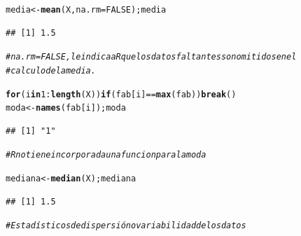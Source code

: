 \documentclass[12pt,letterpaper]{article}\usepackage[]{graphicx}\usepackage[]{color}
\makeatletter
\newcommand{\hlnum}[1]{\textcolor[rgb]{0.686,0.059,0.569}{#1}}%
\newcommand{\hlcom}[1]{\textcolor[rgb]{0.678,0.584,0.686}{\textit{#1}}}%
\newcommand{\hlopt}[1]{\textcolor[rgb]{0,0,0}{#1}}%
\newcommand{\hlstd}[1]{\textcolor[rgb]{0.345,0.345,0.345}{#1}}%
\newcommand{\hlkwa}[1]{\textcolor[rgb]{0.161,0.373,0.58}{\textbf{#1}}}%
\newcommand{\hlkwb}[1]{\textcolor[rgb]{0.69,0.353,0.396}{#1}}%
\newcommand{\hlkwc}[1]{\textcolor[rgb]{0.333,0.667,0.333}{#1}}%
\newcommand{\hlkwd}[1]{\textcolor[rgb]{0.737,0.353,0.396}{\textbf{#1}}}%
\newenvironment{kframe}{%
 \def\at@end@of@kframe{}%
 \ifinner\ifhmode%
  \def\at@end@of@kframe{\end{minipage}}%
  \begin{minipage}{\columnwidth}%
 \fi\fi%
 \def\FrameCommand##1{\hskip\@totalleftmargin \hskip-\fboxsep
 \colorbox{shadecolor}{##1}\hskip-\fboxsep
     \hskip-\linewidth \hskip-\@totalleftmargin \hskip\columnwidth}%
 \MakeFramed {\advance\hsize-\width
   \@totalleftmargin\z@ \linewidth\hsize
   \@setminipage}}%
 {\par\unskip\endMakeFramed%
 \at@end@of@kframe}
\newenvironment{knitrout}{}{} %
\makeatother
\begin{document}
\begin{enumerate}
\begin{knitrout}
\begin{kframe}
\begin{alltt}
\hlstd{media} \hlkwb{<-} \hlkwd{mean}\hlstd{(X,} \hlkwc{na.rm} \hlstd{=} \hlnum{FALSE}\hlstd{); media}
\end{alltt}
\begin{verbatim}
## [1] 1.5
\end{verbatim}
\begin{alltt}
\hlcom{# na.rm = FALSE, le indica a R que los datos faltantes son omitidos en el  }
\hlcom{# calculo de la media. }
\end{alltt}
\end{kframe}
\end{knitrout}
\begin{knitrout}
\color{fgcolor}\begin{kframe}
\begin{alltt}
\hlkwa{for}\hlstd{(i} \hlkwa{in} \hlnum{1}\hlopt{:}\hlkwd{length}\hlstd{(X))} \hlkwa{if} \hlstd{(fab[i]} \hlopt{==} \hlkwd{max}\hlstd{(fab))} \hlkwa{break}\hlstd{()}
\hlstd{moda} \hlkwb{<-} \hlkwd{names}\hlstd{(fab[i]); moda}
\end{alltt}
\begin{verbatim}
## [1] "1"
\end{verbatim}
\begin{alltt}
\hlcom{# R no tiene incorporada una funcion para la moda}

\hlstd{mediana} \hlkwb{<-} \hlkwd{median}\hlstd{(X); mediana}
\end{alltt}
\begin{verbatim}
## [1] 1.5
\end{verbatim}
\end{kframe}
\end{knitrout}
\begin{knitrout}
\color{fgcolor}\begin{kframe}
\begin{alltt}
\hlcom{# Estadísticos de dispersión o variabilidad de los datos }


\end{alltt}
\end{kframe}
\end{knitrout}
\end{enumerate}
\end{document}
